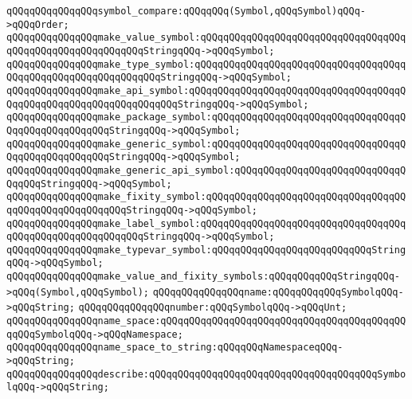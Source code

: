 \newline
\verb|qQQqqQQqqQQqqQQqsymbol_compare:qQQqqQQq(Symbol,qQQqSymbol)qQQq->qQQqOrder;|\newline
\newline
\verb|qQQqqQQqqQQqqQQqmake_value_symbol:qQQqqQQqqQQqqQQqqQQqqQQqqQQqqQQqqQQqqQQqqQQqqQQqqQQqqQQqqQQqStringqQQq->qQQqSymbol;|\newline
\verb|qQQqqQQqqQQqqQQqmake_type_symbol:qQQqqQQqqQQqqQQqqQQqqQQqqQQqqQQqqQQqqQQqqQQqqQQqqQQqqQQqqQQqqQQqStringqQQq->qQQqSymbol;|\newline
\verb|qQQqqQQqqQQqqQQqmake_api_symbol:qQQqqQQqqQQqqQQqqQQqqQQqqQQqqQQqqQQqqQQqqQQqqQQqqQQqqQQqqQQqqQQqqQQqStringqQQq->qQQqSymbol;|\newline
\verb|qQQqqQQqqQQqqQQqmake_package_symbol:qQQqqQQqqQQqqQQqqQQqqQQqqQQqqQQqqQQqqQQqqQQqqQQqqQQqStringqQQq->qQQqSymbol;|\newline
\verb|qQQqqQQqqQQqqQQqmake_generic_symbol:qQQqqQQqqQQqqQQqqQQqqQQqqQQqqQQqqQQqqQQqqQQqqQQqqQQqStringqQQq->qQQqSymbol;|\newline
\verb|qQQqqQQqqQQqqQQqmake_generic_api_symbol:qQQqqQQqqQQqqQQqqQQqqQQqqQQqqQQqqQQqStringqQQq->qQQqSymbol;|\newline
\verb|qQQqqQQqqQQqqQQqmake_fixity_symbol:qQQqqQQqqQQqqQQqqQQqqQQqqQQqqQQqqQQqqQQqqQQqqQQqqQQqqQQqStringqQQq->qQQqSymbol;|\newline
\verb|qQQqqQQqqQQqqQQqmake_label_symbol:qQQqqQQqqQQqqQQqqQQqqQQqqQQqqQQqqQQqqQQqqQQqqQQqqQQqqQQqqQQqStringqQQq->qQQqSymbol;|\newline
\verb|qQQqqQQqqQQqqQQqmake_typevar_symbol:qQQqqQQqqQQqqQQqqQQqqQQqqQQqStringqQQq->qQQqSymbol;|\newline
\newline
\verb|qQQqqQQqqQQqqQQqmake_value_and_fixity_symbols:qQQqqQQqqQQqStringqQQq->qQQq(Symbol,qQQqSymbol);|\newline
\newline
\verb|qQQqqQQqqQQqqQQqname:qQQqqQQqqQQqSymbolqQQq->qQQqString;|\newline
\verb|qQQqqQQqqQQqqQQqnumber:qQQqSymbolqQQq->qQQqUnt;|\newline
\newline
\verb|qQQqqQQqqQQqqQQqname_space:qQQqqQQqqQQqqQQqqQQqqQQqqQQqqQQqqQQqqQQqqQQqqQQqSymbolqQQq->qQQqNamespace;|\newline
\verb|qQQqqQQqqQQqqQQqname_space_to_string:qQQqqQQqNamespaceqQQq->qQQqString;|\newline
\newline
\verb|qQQqqQQqqQQqqQQqdescribe:qQQqqQQqqQQqqQQqqQQqqQQqqQQqqQQqqQQqqQQqSymbolqQQq->qQQqString;|\newline
